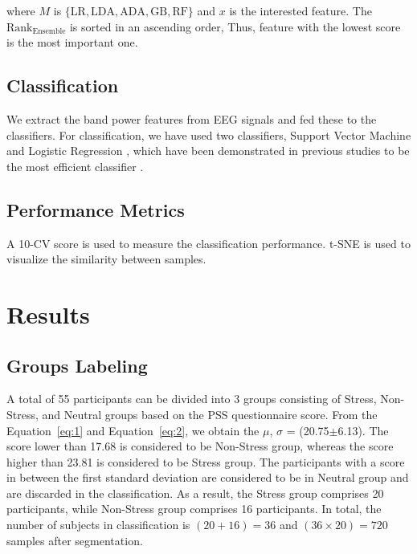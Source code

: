 \documentclass[pdflatex,sn-mathphys]{sn-jnl}%
\theoremstyle{thmstyleone}%
\theoremstyle{thmstyletwo}%
\theoremstyle{thmstylethree}%
\begin{document}
where $M$ is $\{\text{LR}, \text{LDA}, \text{ADA}, \text{GB}, \text{RF} \}$ and $x$ is the interested feature. The $\text{Rank}_{\text{Ensemble}}$ is sorted in an ascending order, Thus, feature with the lowest score is the most important one.

\subsection{Classification}\label{subsec4}
We extract the band power features from EEG signals and fed these to the classifiers. For classification, we have used two classifiers, Support Vector Machine \cite{Alshargie-2018, Subhani-2017} and Logistic Regression \cite{Saeed2020}, which have been demonstrated in previous studies to be the most efficient classifier \cite{Alshargie-2018, Kotsiantis2007, Saeed2020}.

\subsection{Performance Metrics}\label{subsec5}





A 10-CV score is used to measure the classification performance. t-SNE is used to visualize the similarity between samples. 

\section{Results}\label{sec4}

\subsection{Groups Labeling} \label{subsec6}
A total of 55 participants can be divided into 3 groups consisting of Stress, Non-Stress, and Neutral groups based on the PSS questionnaire score. From the Equation~\ref{eq:1} and Equation~\ref{eq:2}, we obtain the $\mu$, $\sigma$ = (20.75$\pm$6.13). The score lower than 17.68 is considered to be Non-Stress group, whereas the score higher than 23.81 is considered to be Stress group. The participants with a score in between the first standard deviation are considered to be in Neutral group and are discarded in the classification. As a result, the Stress group comprises 20 participants, while Non-Stress group comprises 16 participants. In total, the number of subjects in classification is $(20 + 16) = 36$ and $(36 \times 20) = 720$ samples after segmentation.
\end{document}
